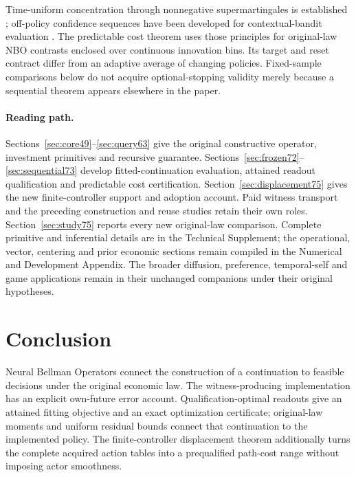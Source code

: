 \documentclass[ecta,nameyear,draft]{econsocart}
\begin{document}
Time-uniform concentration through nonnegative supermartingales is established \citep{howard2020time}; off-policy confidence sequences have been developed for contextual-bandit evaluation \citep{karampatziakis2021}. The predictable cost theorem uses those principles for original-law NBO contrasts enclosed over continuous innovation bins. Its target and reset contract differ from an adaptive average of changing policies. Fixed-sample comparisons below do not acquire optional-stopping validity merely because a sequential theorem appears elsewhere in the paper.

\paragraph{Reading path.}
Sections~\ref{sec:core49}--\ref{sec:query63} give the original constructive operator, investment primitives and recursive guarantee. Sections~\ref{sec:frozen72}--\ref{sec:sequential73} develop fitted-continuation evaluation, attained readout qualification and predictable cost certification. Section~\ref{sec:displacement75} gives the new finite-controller support and adoption account. Paid witness transport and the preceding construction and reuse studies retain their own roles. Section~\ref{sec:study75} reports every new original-law comparison. Complete primitive and inferential details are in the Technical Supplement; the operational, vector, centering and prior economic sections remain compiled in the Numerical and Development Appendix. The broader diffusion, preference, temporal-self and game applications remain in their unchanged companions under their original hypotheses.











\section{Conclusion}\label{sec:conclusion65}
Neural Bellman Operators connect the construction of a continuation to feasible decisions under the original economic law. The witness-producing implementation has an explicit own-future error account. Qualification-optimal readouts give an attained fitting objective and an exact optimization certificate; original-law moments and uniform residual bounds connect that continuation to the implemented policy. The finite-controller displacement theorem additionally turns the complete acquired action tables into a prequalified path-cost range without imposing actor smoothness.
\end{document}
